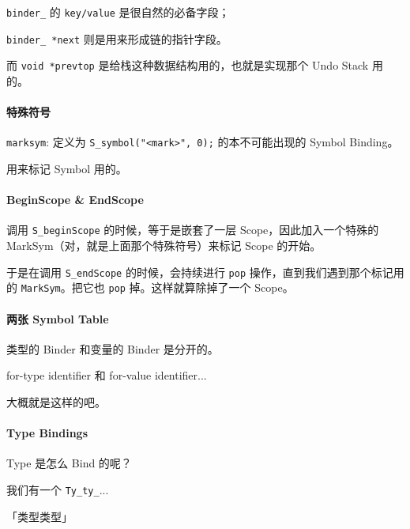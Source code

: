 \documentclass[
]{article}
\begin{document}
\texttt{binder\_} 的 \texttt{key/value} 是很自然的必备字段；

\texttt{binder\_\ *next} 则是用来形成链的指针字段。

而 \texttt{void\ *prevtop} 是给栈这种数据结构用的，也就是实现那个 Undo
Stack 用的。

\hypertarget{header-n85}{%
\paragraph{特殊符号}\label{header-n85}}

\texttt{marksym}: 定义为
\texttt{S\_symbol("\textless{}mark\textgreater{}",\ 0);}
的本不可能出现的 Symbol Binding。

用来标记 Symbol 用的。

\hypertarget{header-n88}{%
\paragraph{BeginScope \& EndScope}\label{header-n88}}

调用 \texttt{S\_beginScope} 的时候，等于是嵌套了一层
Scope，因此加入一个特殊的 MarkSym（对，就是上面那个特殊符号）来标记
Scope 的开始。

于是在调用 \texttt{S\_endScope} 的时候，会持续进行 \texttt{pop}
操作，直到我们遇到那个标记用的 \texttt{MarkSym}。把它也 \texttt{pop}
掉。这样就算除掉了一个 Scope。

\hypertarget{header-n91}{%
\paragraph{两张 Symbol Table}\label{header-n91}}

类型的 Binder 和变量的 Binder 是分开的。

for-type identifier 和 for-value identifier...

大概就是这样的吧。

\hypertarget{header-n95}{%
\paragraph{Type Bindings}\label{header-n95}}

Type 是怎么 Bind 的呢？

我们有一个 \texttt{Ty\_ty\_}...

「类型类型」
\end{document}
